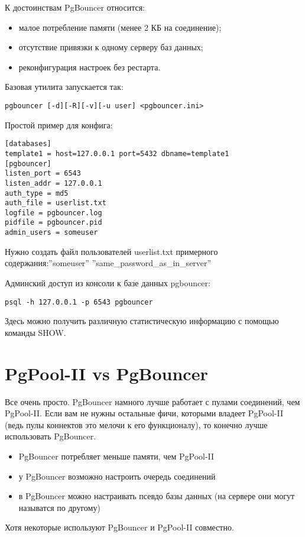 К достоинствам PgBouncer относится:
\begin{itemize}
\item малое потребление памяти (менее 2 КБ на соединение);
\item отсутствие привязки к одному серверу баз данных;
\item реконфигурация настроек без рестарта.
\end{itemize}

Базовая утилита запускается так:
\begin{lstlisting}[label=lst:pgbouncer1,caption=PgBouncer]
pgbouncer [-d][-R][-v][-u user] <pgbouncer.ini>
\end{lstlisting}

Простой пример для конфига:
\begin{lstlisting}[label=lst:pgbouncer2,caption=PgBouncer]
[databases]
template1 = host=127.0.0.1 port=5432 dbname=template1
[pgbouncer]
listen_port = 6543
listen_addr = 127.0.0.1
auth_type = md5
auth_file = userlist.txt
logfile = pgbouncer.log
pidfile = pgbouncer.pid
admin_users = someuser
\end{lstlisting}

Нужно создать файл пользователей userlist.txt примерного содержания:''someuser'' ''same\_password\_as\_in\_server''

Админский доступ из консоли к базе данных pgbouncer:
\begin{lstlisting}[label=lst:pgbouncer3,caption=PgBouncer]
psql -h 127.0.0.1 -p 6543 pgbouncer
\end{lstlisting}

Здесь можно получить различную статистическую информацию с помощью команды SHOW.

\section{PgPool-II vs PgBouncer}

Все очень просто. PgBouncer намного лучше работает с пулами соединений, чем PgPool-II. Если вам не 
нужны остальные фичи, которыми владеет PgPool-II (ведь пулы коннектов это мелочи к его функционалу), 
то конечно лучше использовать PgBouncer. 
\begin{itemize}
\item PgBouncer потребляет меньше памяти, чем PgPool-II
\item у PgBouncer возможно настроить очередь соединений
\item в PgBouncer можно настраивать псевдо базы данных (на сервере они могут называтся по другому)
\end{itemize}

Хотя некоторые используют PgBouncer и PgPool-II совместно.